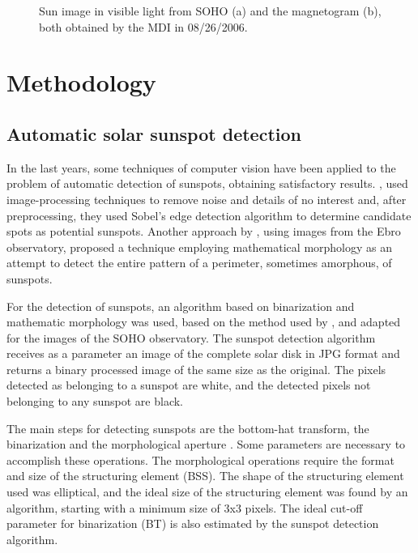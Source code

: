 \documentclass[namedreferences]{solarphysics}
\begin{document}
\begin{article}
\begin{figure}
\caption{Sun image in visible light from SOHO (a) and the magnetogram (b), both obtained by the MDI in 08/26/2006.
        }
   \label{fig1}
   \end{figure}

\section{Methodology} %
      \label{S-meth}      

\subsection{Automatic solar sunspot detection} %
  \label{S-detect}
In the last years, some techniques of computer vision have been applied to the problem of automatic detection of sunspots, obtaining satisfactory results.
\citealp{zharkov2005}, used image-processing techniques to remove noise and details of no interest and,
after preprocessing, they used Sobel's edge detection algorithm to determine candidate spots as potential sunspots.
Another approach by \citealp{curto2008},
using images from the Ebro observatory, proposed a technique employing mathematical morphology as an attempt to detect the entire pattern of a perimeter, sometimes amorphous, of sunspots.

For the detection of sunspots, an algorithm based on binarization and mathematic morphology was used,
based on the method used by \citealp{curto2008},
and adapted for the images of the SOHO observatory.
The sunspot detection algorithm receives as a parameter an image of the complete solar disk in JPG format and returns a binary processed image of the same size as the original.
The pixels detected as belonging to a sunspot are white,
and the detected pixels not belonging to any sunspot are black.

The main steps for detecting sunspots are the bottom-hat transform, the binarization and the morphological aperture \citep{spagiari2012}.
Some parameters are necessary to accomplish these operations.
The morphological operations require the format and size of the structuring element (BSS).
The shape of the structuring element used was elliptical,
and the ideal size of the structuring element was found by an algorithm, 
starting with a minimum size of 3x3 pixels.
The ideal cut-off parameter for binarization (BT) is also estimated by the sunspot detection algorithm.


\end{article}
\end{document}
